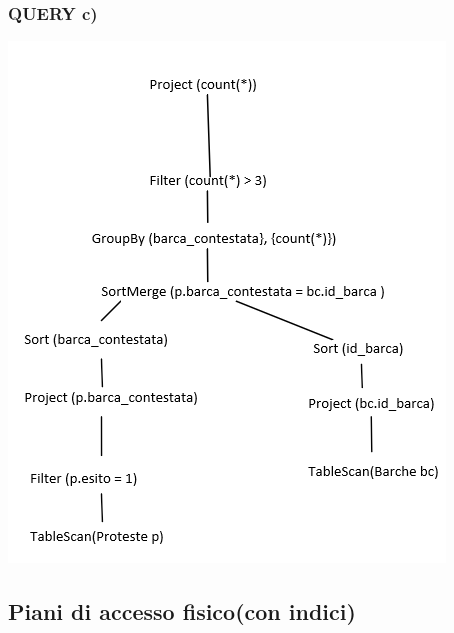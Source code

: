 \documentclass{article}
\begin{document}
\subsubsection{QUERY c)}
\includegraphics[]{fisicoc.png}

\subsection{Piani di accesso fisico(con indici)}
\end{document}
